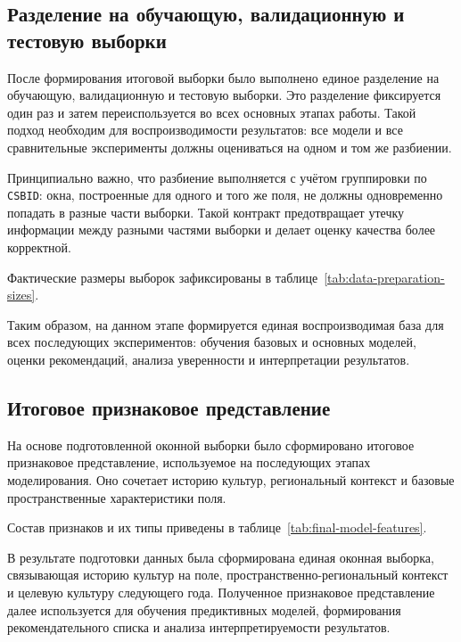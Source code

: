 \subsection{Разделение на обучающую, валидационную и тестовую выборки}

После формирования итоговой выборки было выполнено единое разделение на обучающую, валидационную и тестовую выборки.
Это разделение фиксируется один раз и затем переиспользуется во всех основных этапах работы.
Такой подход необходим для
воспроизводимости результатов: все модели и все сравнительные эксперименты должны оцениваться на одном и том же
разбиении.

Принципиально важно, что разбиение выполняется с учётом группировки по \texttt{CSBID}: окна, построенные
для одного и того же поля, не должны одновременно попадать в разные части выборки. Такой контракт предотвращает утечку
информации между разными частями выборки и делает оценку качества более корректной.

Фактические размеры выборок зафиксированы в таблице~\ref{tab:data-preparation-sizes}.



Таким образом, на данном этапе формируется единая воспроизводимая база для всех последующих экспериментов: 
обучения базовых и основных моделей, оценки рекомендаций, анализа уверенности и интерпретации результатов.

\subsection{Итоговое признаковое представление}

На основе подготовленной оконной выборки было сформировано итоговое признаковое представление,
используемое на последующих этапах моделирования.
Оно сочетает историю культур, региональный контекст и базовые пространственные характеристики поля.

Состав признаков и их типы приведены в таблице~\ref{tab:final-model-features}.



В результате подготовки данных была сформирована единая оконная выборка, связывающая историю культур на поле,
пространственно-региональный контекст и целевую культуру следующего года. Полученное признаковое представление далее
используется для обучения предиктивных моделей, формирования рекомендательного списка и анализа интерпретируемости
результатов.

